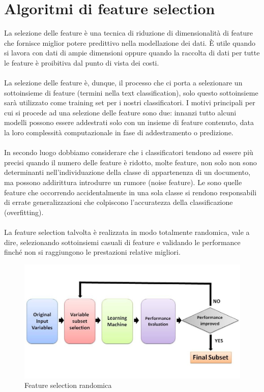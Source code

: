 \documentclass{article}
\theoremstyle{plain}
\theoremstyle{definition}
\begin{document}
\newpage
\section{Algoritmi di feature selection}
La selezione delle feature è una tecnica di riduzione di dimensionalità di feature che fornisce miglior potere predittivo nella modellazione dei dati. È utile quando si lavora con dati di ampie dimensioni oppure quando la raccolta di dati per tutte le feature è proibitiva dal punto di vista dei costi.
\\
\\
La selezione delle feature è, dunque, il processo che ci porta a selezionare un sottoinsieme di feature (termini nella text classification), solo questo sottoinsieme sarà utilizzato come training set per i nostri classificatori. I motivi principali per cui si procede ad una selezione delle feature sono due: innanzi tutto alcuni modelli possono essere addestrati solo con un insieme di feature contenuto, data la loro complessità computazionale in fase di addestramento o predizione. 
\\
\\
In secondo luogo dobbiamo considerare che i classificatori tendono ad essere più precisi quando il numero delle feature è ridotto, molte feature, non solo non sono determinanti nell'individuazione della classe di appartenenza di un documento, ma possono addirittura introdurre un rumore (noise feature). Le  sono quelle feature che occorrendo accidentalmente in una sola classe si rendono responsabili di errate generalizzazioni che colpiscono l'accuratezza della classificazione (overfitting).
\\
\\
La feature selection talvolta è realizzata in modo totalmente randomica, vale a dire, selezionando sottoinsiemi casuali di feature e validando le performance finché non si raggiungono le prestazioni relative migliori.
\begin{figure}[htbp]
\begin{center}
\includegraphics[scale=0.70]{img/fs.jpeg}
\caption{Feature selection randomica}
\end{center}
\end{figure}
\end{document}
